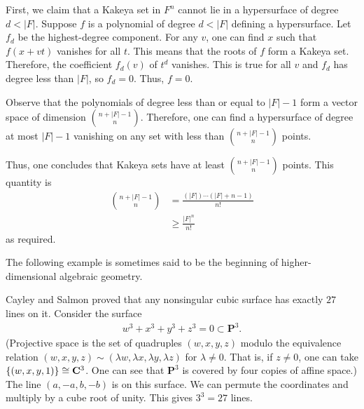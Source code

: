 \documentclass [11 pt, oneside, margin = 1 in] {article}
\begin{document}
First, we claim that a Kakeya set in $F^n$ cannot lie in a hypersurface of degree $d<\left\lvert F \right\rvert $. Suppose $f$ is a polynomial of degree $d<\left\lvert F \right\rvert $ defining a hypersurface. Let $f_d$ be the highest-degree component. For any $v$, one can find $x$ such that $f(x+vt)$ vanishes for all $t$. This means that the roots of $f$ form a Kakeya set. Therefore, the coefficient $f_d(v)$ of $t^d$ vanishes. This is true for all $v$ and $f_d$ has degree less than $\left\lvert F \right\rvert $, so $f_d=0$. Thus, $f=0$.

Observe that the polynomials of degree less than or equal to $\left\lvert F \right\rvert -1$ form a vector space of dimension $\binom{n+\left\lvert F \right\rvert -1}{n}$. Therefore, one can find a hypersurface of degree at most $\left\lvert F \right\rvert -1$ vanishing on any set with less than $\binom{n+\left\lvert F \right\rvert -1}{n}$ points.

Thus, one concludes that Kakeya sets have at least $\binom{n+\left\lvert F \right\rvert -1}{n}$ points. This quantity is 
\begin{align*}
	\binom{n+\left\lvert F \right\rvert -1}{n} &= \frac{(\left\lvert F \right\rvert ) \cdots (\left\lvert F \right\rvert +n-1)}{n!} \\
						   &\ge \frac{\left\lvert F \right\rvert ^n}{n!}
\end{align*}
as required.

The following example is sometimes said to be the beginning of higher-dimensional algebraic geometry.

\begin{example}\label{}\text{}
Cayley and Salmon proved that any nonsingular cubic surface has exactly $27$ lines on it. Consider the surface
\begin{align*}
	w^3 + x^3 +y^3 + z^3 = 0 \subset \mathbf{P}^3.
\end{align*}
(Projective space is the set of quadruples $(w,x,y,z)$ modulo the equivalence relation $(w,x,y,z)\sim  (\lambda w, \lambda x, \lambda y,\lambda z)$ for $\lambda\ne 0$. That is, if $z\ne 0$, one can take $\{(w,x,y,1)\} \cong  \mathbf{C}^3$. One can see that $\mathbf{P}^3$ is covered by four copies of affine space.) The line $(a,-a,b,-b)$ is on this surface. We can permute the coordinates and multiply by a cube root of unity. This gives $3^3 = 27$ lines.  
\end{example}
\end{document}
